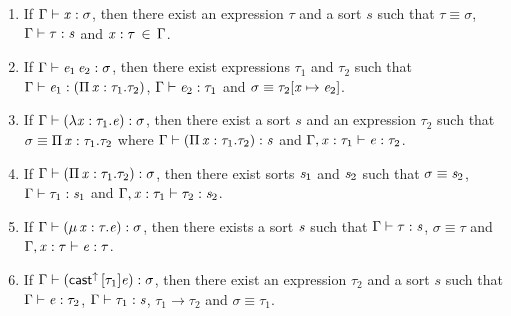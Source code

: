 \begin{lem}\label{lem:gen}
$\quad$
\begin{enumerate}[(1)]
	\item If $\Gamma  \vdash  \mathit{x}  :  \sigma$, then there exist an expression $\tau$ and a sort $s$ such that $\tau  \equiv  \sigma$, $\Gamma  \vdash  \tau  :  \mathit{s}$ and $\mathit{x}  :  \tau \, \in \, \Gamma$.
	\item If $\Gamma  \vdash  \mathit{e_{{\mathrm{1}}}} \, \mathit{e_{{\mathrm{2}}}}  :  \sigma$, then there exist expressions $\tau_{{\mathrm{1}}}$ and $\tau_{{\mathrm{2}}}$ such that $\Gamma  \vdash  \mathit{e_{{\mathrm{1}}}}  :  (  \Pi \, \mathit{x}  :  \tau_{{\mathrm{1}}}  .  \tau_{{\mathrm{2}}}  )$, $\Gamma  \vdash  \mathit{e_{{\mathrm{2}}}}  :  \tau_{{\mathrm{1}}}$ and $\sigma  \equiv  \tau_{{\mathrm{2}}}  [  \mathit{x}  \mapsto  \mathit{e_{{\mathrm{2}}}}  ]$.
	\item If $\Gamma  \vdash  (  \lambda  \mathit{x}  :  \tau_{{\mathrm{1}}}  .  \mathit{e}  )  :  \sigma$, then there exist a sort $s$ and an expression $\tau_{{\mathrm{2}}}$ such that $\sigma  \equiv  \Pi \, \mathit{x}  :  \tau_{{\mathrm{1}}}  .  \tau_{{\mathrm{2}}}$ where $\Gamma  \vdash  (  \Pi \, \mathit{x}  :  \tau_{{\mathrm{1}}}  .  \tau_{{\mathrm{2}}}  )  :  \mathit{s}$ and $\Gamma  ,  \mathit{x}  :  \tau_{{\mathrm{1}}}  \vdash  \mathit{e}  :  \tau_{{\mathrm{2}}}$.
	\item If $\Gamma  \vdash  (  \Pi \, \mathit{x}  :  \tau_{{\mathrm{1}}}  .  \tau_{{\mathrm{2}}}  )  :  \sigma$, then there exist sorts $\mathit{s_{{\mathrm{1}}}}$ and $\mathit{s_{{\mathrm{2}}}}$ such that $\sigma  \equiv  \mathit{s_{{\mathrm{2}}}}$, $\Gamma  \vdash  \tau_{{\mathrm{1}}}  :  \mathit{s_{{\mathrm{1}}}}$ and $\Gamma  ,  \mathit{x}  :  \tau_{{\mathrm{1}}}  \vdash  \tau_{{\mathrm{2}}}  :  \mathit{s_{{\mathrm{2}}}}$.
	\item If $\Gamma  \vdash  (  \mu \, \mathit{x}  :  \tau  .  \mathit{e}  )  :  \sigma$, then there exists a sort $\mathit{s}$ such that $\Gamma  \vdash  \tau  :  \mathit{s}$, $\sigma  \equiv  \tau$ and $\Gamma  ,  \mathit{x}  :  \tau  \vdash  \mathit{e}  :  \tau$.
	\item If $\Gamma  \vdash  (  \mathsf{cast}^{\uparrow} \, [  \tau_{{\mathrm{1}}}  ]  \mathit{e}  )  :  \sigma$, then there exist an expression $\tau_{{\mathrm{2}}}$ and a sort $s$ such that $\Gamma  \vdash  \mathit{e}  :  \tau_{{\mathrm{2}}}$, $\Gamma  \vdash  \tau_{{\mathrm{1}}}  :  \mathit{s}$, $\tau_{{\mathrm{1}}}  \longrightarrow  \tau_{{\mathrm{2}}}$ and $\sigma  \equiv  \tau_{{\mathrm{1}}}$.

\end{enumerate}
\end{lem}
